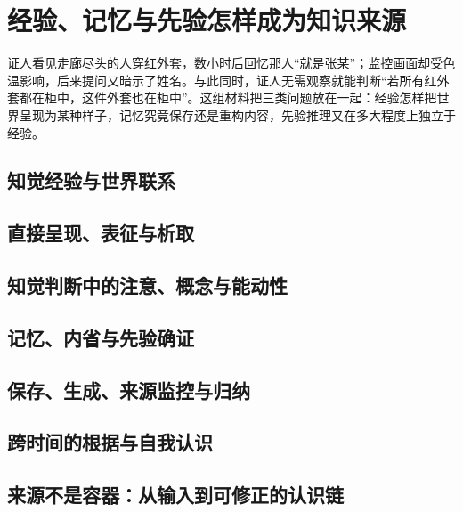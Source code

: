 \chapter{经验、记忆与先验怎样成为知识来源}

\begin{openingcase}
证人看见走廊尽头的人穿红外套，数小时后回忆那人“就是张某”；监控画面却受色温影响，后来提问又暗示了姓名。与此同时，证人无需观察就能判断“若所有红外套都在柜中，这件外套也在柜中”。这组材料把三类问题放在一起：经验怎样把世界呈现为某种样子，记忆究竟保存还是重构内容，先验推理又在多大程度上独立于经验。
\end{openingcase}

\section{知觉经验与世界联系}


\section{直接呈现、表征与析取}


\section{知觉判断中的注意、概念与能动性}



\section{记忆、内省与先验确证}


\section{保存、生成、来源监控与归纳}


\section{跨时间的根据与自我认识}



\section{来源不是容器：从输入到可修正的认识链}


